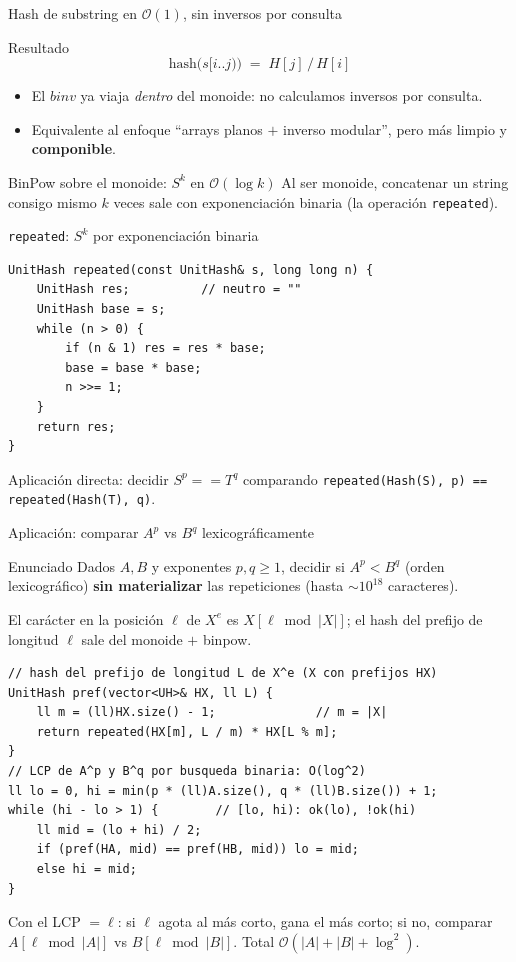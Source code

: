 \documentclass{beamer}
\begin{document}
\begin{frame}{Hash de substring en $\mathcal{O}(1)$, sin inversos por consulta}
\begin{block}{Resultado}
\[
\text{hash}\big(s[i..j)\big) \;=\; H[j] \,/\, H[i]
\]
\end{block}
\begin{itemize}
    \item El $binv$ ya viaja \emph{dentro} del monoide: no calculamos inversos por consulta.
    \item Equivalente al enfoque ``arrays planos $+$ inverso modular'', pero más limpio y \textbf{componible}.
\end{itemize}
\end{frame}

\begin{frame}[fragile]{BinPow sobre el monoide: $S^k$ en $\mathcal{O}(\log k)$}
Al ser monoide, concatenar un string consigo mismo $k$ veces sale con exponenciación binaria (la operación \texttt{repeated}).
\begin{exampleblock}{\texttt{repeated}: $S^k$ por exponenciación binaria}
\begin{verbatim}
UnitHash repeated(const UnitHash& s, long long n) {
    UnitHash res;          // neutro = ""
    UnitHash base = s;
    while (n > 0) {
        if (n & 1) res = res * base;
        base = base * base;
        n >>= 1;
    }
    return res;
}
\end{verbatim}
\end{exampleblock}
Aplicación directa: decidir $S^p == T^q$ comparando \verb|repeated(Hash(S), p) == repeated(Hash(T), q)|.
\end{frame}

\begin{frame}[fragile]{Aplicación: comparar $A^p$ vs $B^q$ lexicográficamente}
\begin{block}{Enunciado}
Dados $A,B$ y exponentes $p,q\ge 1$, decidir si $A^p < B^q$ (orden lexicográfico) \textbf{sin materializar} las repeticiones (hasta $\sim 10^{18}$ caracteres).
\end{block}
\pause
El carácter en la posición $\ell$ de $X^e$ es $X[\ell\bmod|X|]$; el hash del prefijo de longitud $\ell$ sale del monoide $+$ binpow.
{\scriptsize
\begin{verbatim}
// hash del prefijo de longitud L de X^e (X con prefijos HX)
UnitHash pref(vector<UH>& HX, ll L) {
    ll m = (ll)HX.size() - 1;              // m = |X|
    return repeated(HX[m], L / m) * HX[L % m];
}
// LCP de A^p y B^q por busqueda binaria: O(log^2)
ll lo = 0, hi = min(p * (ll)A.size(), q * (ll)B.size()) + 1;
while (hi - lo > 1) {        // [lo, hi): ok(lo), !ok(hi)
    ll mid = (lo + hi) / 2;
    if (pref(HA, mid) == pref(HB, mid)) lo = mid;
    else hi = mid;
}
\end{verbatim}
}
Con el LCP $=\ell$: si $\ell$ agota al más corto, gana el más corto; si no, comparar $A[\ell\bmod|A|]$ vs $B[\ell\bmod|B|]$. Total $\mathcal{O}(|A|+|B|+\log^2)$.
\end{frame}
\end{document}
